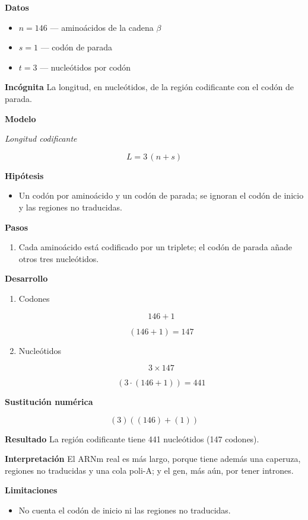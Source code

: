 \documentclass{book}
\begin{document}
\noindent\textbf{Datos}
\begin{itemize}
\item $n = 146$ — aminoácidos de la cadena \(\beta\)
\item $s = 1$ — codón de parada
\item $t = 3$ — nucleótidos por codón
\end{itemize}

\noindent\textbf{Incógnita}
La longitud, en nucleótidos, de la región codificante con el codón de parada.


\noindent\textbf{Modelo}

\noindent\textit{Longitud codificante}

\[
L = 3\,(n + s)
\]

\noindent\textbf{Hipótesis}
\begin{itemize}
\item Un codón por aminoácido y un codón de parada; se ignoran el codón de inicio y las regiones no traducidas.
\end{itemize}

\noindent\textbf{Pasos}
\begin{enumerate}
\item
Cada aminoácido está codificado por un triplete; el codón de parada añade otros tres nucleótidos.

\end{enumerate}

\noindent\textbf{Desarrollo}
\begin{enumerate}
\item
Codones


\[
146 + 1
\]

\[
\left(146+1\right) = 147
\]
\item
Nucleótidos


\[
3 \times 147
\]

\[
\left(3\cdot \left(146+1\right)\right) = 441
\]
\end{enumerate}

\noindent\textbf{Sustitución numérica}

\[
\left(3\right) \left(\left(146\right) + \left(1\right)\right)
\]

\noindent\textbf{Resultado}
La región codificante tiene 441 nucleótidos (147 codones).


\noindent\textbf{Interpretación}
El ARNm real es más largo, porque tiene además una caperuza, regiones no traducidas y una cola poli-A; y el gen, más aún, por tener intrones.


\noindent\textbf{Limitaciones}
\begin{itemize}
\item No cuenta el codón de inicio ni las regiones no traducidas.
\end{itemize}
\end{document}

